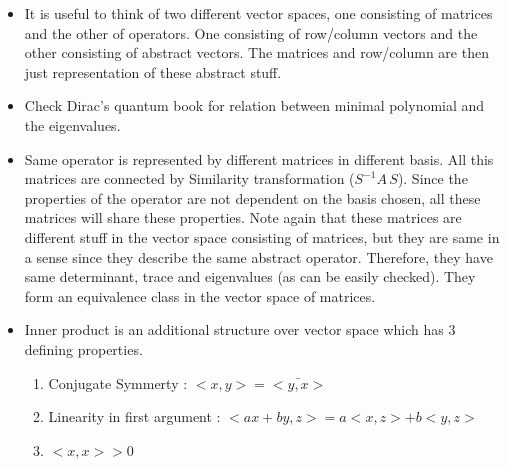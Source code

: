 \documentclass{report}
\begin{document}
\begin{itemize}
  \item It is useful to think of two different vector spaces, one consisting of matrices and the other of operators. One consisting of row/column vectors and the other consisting of abstract vectors. The matrices and row/column are then just representation of these abstract stuff.
  
  \item Check Dirac's quantum book for relation between minimal polynomial and the eigenvalues.

  \item Same operator is represented by different matrices in different basis. All this matrices are connected by Similarity transformation ($S^{-1}A\,S$). Since the properties of the operator are not dependent on the basis chosen, all these matrices will share these properties. Note again that these matrices are different stuff in the vector space consisting of matrices, but they are same in a sense since they describe the same abstract operator. Therefore, they have same determinant, trace and eigenvalues (as can be easily checked). They form an equivalence class in the vector space of matrices.

  \item Inner product is an additional structure over vector space which has $3$ defining properties. 

    \begin{enumerate}
      \item Conjugate Symmerty : $<x,y> = \bar{<y,x>}$
      \item Linearity in first argument : $<ax+by,z> = a<x,z>+b<y,z>$
      \item $<x,x> > 0$
    \end{enumerate}


\end{itemize}
\end{document}
